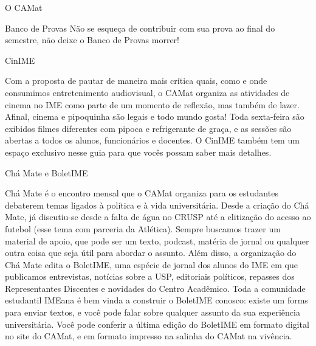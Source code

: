 \begin{secao}{O CAMat}
\begin{subsecao}{Banco de Provas}
Não se esqueça de contribuir com sua prova ao final do semestre, não
deixe o Banco de Provas morrer! 

\end{subsecao}




\begin{subsecao}{CinIME}

Com a proposta de pautar de maneira mais crítica quais, como e onde consumimos 
entretenimento audiovisual, o CAMat organiza as atividades de cinema no IME 
como parte de um momento de reflexão, mas também de lazer. Afinal, cinema e 
pipoquinha são legais e todo mundo gosta! Toda sexta-feira são exibidos filmes 
diferentes com pipoca e refrigerante de graça, e as sessões são abertas a todos 
os alunos, funcionários e docentes. O CinIME também tem um espaço exclusivo nesse
guia para que vocês possam saber mais detalhes.

\end{subsecao}

\begin{subsecao}{Chá Mate e BoletIME}

Chá Mate é o encontro mensal que o CAMat organiza para os estudantes debaterem temas
ligados à política e à vida universitária. Desde a criação do Chá Mate, já discutiu-se
desde a falta de água no CRUSP até a elitização do acesso ao futebol (esse tema com parceria
da Atlética). Sempre buscamos trazer um material de apoio, que pode ser um texto, podcast, matéria
de jornal ou qualquer outra coisa que seja útil para abordar o assunto. 
Além disso, a organização do Chá Mate edita o BoletIME, uma espécie de jornal dos alunos do IME em
que publicamos entrevistas, notícias sobre a USP, editoriais políticos, repasses dos Representantes
Discentes e novidades do Centro Acadêmico. Toda a comunidade estudantil IMEana é bem vinda a construir
o BoletIME conosco: existe um forms para enviar textos, e você pode falar sobre qualquer assunto da sua
experiência universitária. Você pode conferir a última edição do BoletIME em formato 
digital no site do CAMat, e em formato impresso na salinha do CAMat na vivência.


\end{subsecao}
\end{secao}
